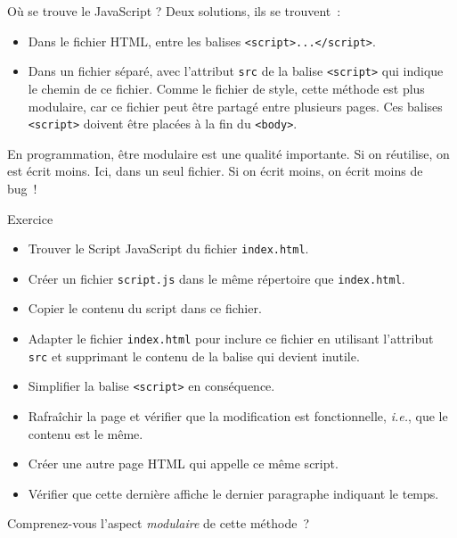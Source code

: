 \documentclass{beamer}
\begin{document}
    \begin{frame}{Où se trouve le JavaScript ?}
        Deux solutions, ils se trouvent~:
        \begin{itemize}
            \item Dans le fichier HTML, entre les balises \lstinline{<script>...</script>}.
            \item Dans un fichier séparé, avec l'attribut
            \lstinline{src} de la balise \lstinline{<script>} qui indique le chemin de ce
            fichier. Comme le fichier de style, cette méthode est plus modulaire, car ce
            fichier peut être partagé entre plusieurs pages.
            Ces balises \lstinline{<script>} doivent être placées à la fin du \lstinline{<body>}.
        \end{itemize}
        \bigbreak
        \begin{dangercolorbox}
            En programmation, être modulaire est une qualité importante. Si on réutilise, on est écrit moins.
            Ici, dans un seul fichier.
            Si on écrit moins, on écrit moins de bug~!
        \end{dangercolorbox}
    \end{frame}

    \begin{frame}{Exercice \execcounterdispinc{}}
        \begin{itemize}
            \item Trouver le Script JavaScript du fichier \lstinline{index.html}.
            \item Créer un fichier
            \lstinline{script.js} dans le même répertoire que \lstinline{index.html}.
            \item Copier le contenu du script dans ce fichier.
            \item Adapter le fichier
            \lstinline{index.html} pour inclure ce fichier en utilisant l'attribut \lstinline{src}
            et supprimant le contenu de la balise qui devient inutile.
            \item Simplifier la balise \lstinline{<script>} en conséquence.
            \item Rafraîchir la page et vérifier que la modification est fonctionnelle,
            \textit{i.e.}, que le contenu est le même.
            \item Créer une autre page HTML qui appelle ce même script.
            \item Vérifier que cette dernière affiche le dernier paragraphe indiquant le temps.
        \end{itemize}
        Comprenez-vous l'aspect \textit{modulaire} de cette méthode~?
    \end{frame}
\end{document}

